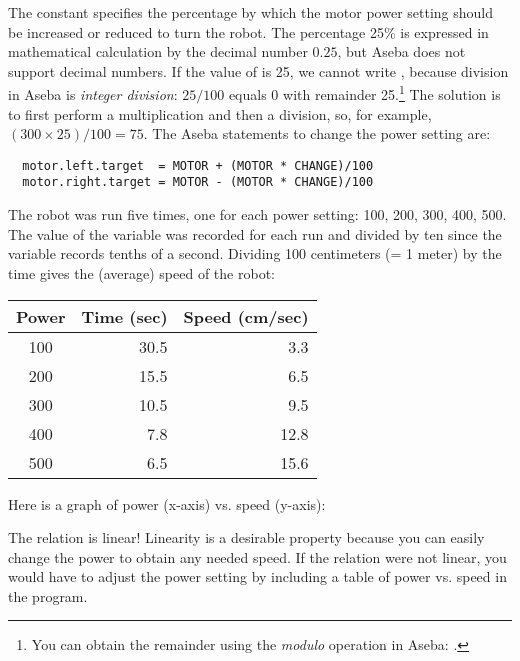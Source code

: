 The constant  specifies the percentage by which the motor
power setting  should be increased or reduced to turn the
robot. The percentage 25\% is expressed in mathematical calculation by
the decimal number $0.25$, but Aseba does not support decimal numbers.
If the value of  is 25, we cannot write ,
because division in Aseba is \emph{integer division}: $25/100$ equals 0
with remainder 25.\footnote{You can obtain the remainder using the
\emph{modulo} operation in Aseba: .} The solution is to
first perform a multiplication and then a division, so, for example,
$(300\times 25)/100 = 75$. The Aseba statements to change the power
setting are:

\begin{verbatim}
  motor.left.target  = MOTOR + (MOTOR * CHANGE)/100
  motor.right.target = MOTOR - (MOTOR * CHANGE)/100
\end{verbatim}



The robot was run five times, one for each power setting: 100, 200, 300,
400, 500. The value of the variable  was recorded for each run
and divided by ten since the variable records tenths of a second.
Dividing 100 centimeters (= 1 meter) by the time gives the (average)
speed of the robot:

\begin{center}
\begin{tabular}{|c|r|r|}\hline
Power  & Time (sec)  &Speed (cm/sec)\\\hline
100&30.5  &3.3\\\hline
200&15.5  &6.5\\\hline
300&10.5  &9.5\\\hline
400&7.8   &12.8\\\hline
500&6.5   &15.6\\\hline
\end{tabular}
\end{center}

Here is a graph of power (x-axis) vs. speed (y-axis):


The relation is linear! Linearity is a desirable property because you
can easily change the power to obtain any needed speed. If the relation
were not linear, you would have to adjust the power setting by including
a table of power vs. speed in the program.

